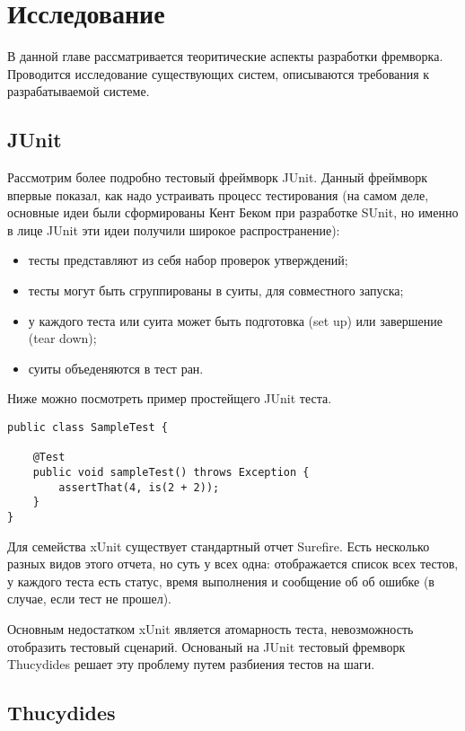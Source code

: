 \chapter{Исследование}
\label{chapter2}

В данной главе рассматривается теоритические аспекты разработки фремворка. Проводится исследование существующих систем, описываются требования к разрабатываемой системе.

\section{JUnit}

Рассмотрим более подробно тестовый фреймворк JUnit. Данный фреймворк впервые показал, как надо устраивать процесс тестирования (на самом деле, основные идеи были сформированы Кент Беком при разработке SUnit, но именно в лице JUnit эти идеи получили широкое распространение):

\begin{itemize}
\item тесты представляют из себя набор проверок утверждений;
\item тесты могут быть сгруппированы в суиты, для совместного запуска;
\item у каждого теста или суита может быть подготовка (set up) или завершение (tear down);
\item суиты объеденяются в тест ран.
\end{itemize}

Ниже можно посмотреть пример простейщего JUnit теста.

\begin{lstlisting}
public class SampleTest {

    @Test
    public void sampleTest() throws Exception {
        assertThat(4, is(2 + 2));
    }
}
\end{lstlisting}

Для семейства xUnit существует стандартный отчет Surefire. Есть несколько разных видов этого отчета, но суть у всех одна: отображается список всех тестов, у каждого теста есть статус, время выполнения и сообщение об об ошибке (в случае, если тест не прошел). 

Основным недостатком xUnit является атомарность теста, невозможность отобразить тестовый сценарий. Основаный на JUnit тестовый фремворк Thucydides решает эту проблему путем разбиения тестов на шаги.

\section{Thucydides}

